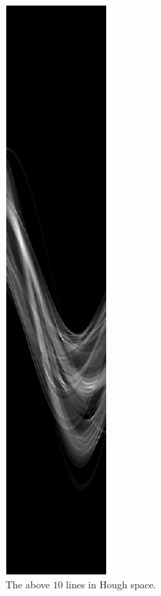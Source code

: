     \begin{figure}[H]
      \centering
      \includegraphics[scale=0.8]{./images/Q8/phonecalc256/2.png}
      \caption{The above $10$ lines in Hough space.}
      \label{fig:Q8_phonecalc256_2}
    \end{figure}

